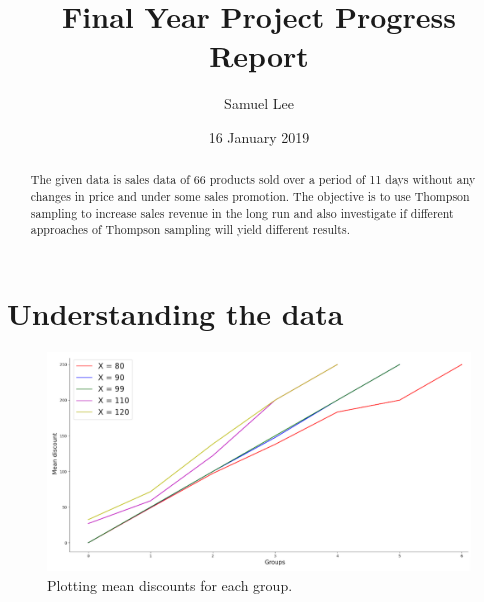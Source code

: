 \documentclass[a4paper]{article}
\title{Final Year Project Progress Report}
\author{Samuel Lee}
\date{16 January 2019}
\begin{document}
\maketitle

\begin{abstract}
The given data is sales data of 66 products sold over a period of 11 days without any changes in price and under some sales promotion. The objective is to use Thompson sampling to increase sales revenue in the long run and also investigate if different approaches of Thompson sampling will yield different results.
\end{abstract}

\section{Understanding the data}
\label{sec:introduction}
\begin{figure}
\centering
\includegraphics[width=1\textwidth]{cut.png}
\caption{\label{fig:cut}Plotting mean discounts for each group.}
\end{figure}
\end{document}
